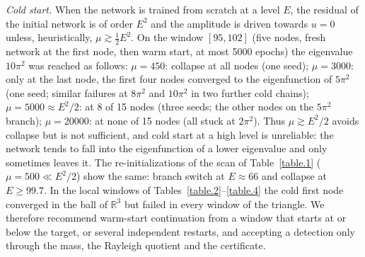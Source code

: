 \documentclass[10pt]{amsart}
\newenvironment{revblock}{\color{blue}}{}
\theoremstyle{definition}
\theoremstyle{remark}
\theoremstyle{plain}
\newcommand{\R}{\mathbb{R}}
\begin{document}
\begin{revblock}
\emph{Cold start.} When the network is trained from scratch at a level $E$, the residual of the
initial network is of order $E^2$ and the amplitude is driven towards $u=0$ unless, heuristically,
$\mu\gtrsim\frac12E^2$. On the window $[95,102]$ (five nodes, fresh network at the first node, then
warm start, at most 5000 epochs) the eigenvalue $10\pi^2$ was reached as follows: $\mu=450$: collapse at
all nodes (one seed); $\mu=3000$: only at the last node, the first four nodes converged to the
eigenfunction of $5\pi^2$ (one seed; similar failures at $8\pi^2$ and $10\pi^2$ in two further cold
chains); $\mu=5000\approx E^2/2$: at 8 of 15 nodes (three seeds; the other nodes on the $5\pi^2$
branch); $\mu=20000$: at none of 15 nodes (all stuck at $2\pi^2$). Thus $\mu\gtrsim E^2/2$ avoids
collapse but is not sufficient, and cold start at a high level is unreliable: the network tends to
fall into the eigenfunction of a lower eigenvalue and only sometimes leaves it. The re-initializations
of the scan of Table~\ref{table.1} ($\mu=500\ll E^2/2$) show the same: branch switch at $E\approx66$ and
collapse at $E\ge99.7$. In the local windows of Tables~\ref{table.2}--\ref{table.4} the cold first node
converged in the ball of $\R^3$ but failed in every window of the triangle. We therefore recommend
warm-start continuation from a window that starts at or below the target, or several independent
restarts, and accepting a detection only through the mass, the Rayleigh quotient and the certificate.
\end{revblock}
\end{document}
